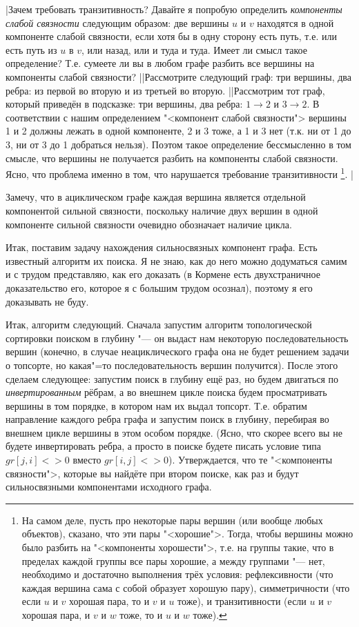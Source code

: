 \task|Зачем требовать транзитивность? Давайте я попробую определить \emph{компоненты слабой связности} следующим 
образом: две вершины $u$ и $v$ находятся в одной компоненте слабой связности, если хотя бы в одну сторону есть путь, 
т.е. или есть путь из $u$ в $v$, или назад, или и туда и туда. Имеет ли смысл такое определение? Т.е. сумеете ли вы
в любом графе разбить все вершины на компоненты слабой связности?
||Рассмотрите следующий граф: три вершины, два ребра: из первой во вторую и из третьей во вторую.
||Рассмотрим тот граф, который приведён в подсказке: три вершины, два ребра: $1\to 2$ и $3\to 2$.
В соответствии с нашим определением "<компонент слабой связности"> вершины 1 и 2 должны лежать в одной компоненте,
2 и 3 тоже, а 1 и 3 нет (т.к. ни от 1 до 3, ни от 3 до 1 добраться нельзя). Поэтом такое определение
бессмысленно в том смысле, что вершины не получается разбить на компоненты слабой связности. Ясно, что проблема
именно в том, что нарушается требование транзитивности%
\footnote{На самом деле, пусть про некоторые пары вершин (или вообще любых объектов), сказано, что эти пары "<хорошие">.
Тогда, чтобы вершины можно было разбить на "<компоненты хорошести">, т.е. на группы такие, что
в пределах каждой группы все пары хорошие, а между группами "--- нет, необходимо и достаточно
выполнения трёх условия: рефлексивности (что каждая вершина сама с собой образует хорошую пару),
симметричности (что если $u$ и $v$ хорошая пара, то и $v$ и $u$ тоже), и транзитивности
(если $u$ и $v$ хорошая пара, и $v$ и $w$ тоже, то и $u$ и $w$ тоже).}.
|\label{transitive}

Замечу, что в ациклическом графе каждая вершина является отдельной компонентой сильной связности, поскольку наличие двух
вершин в одной компоненте сильной связности очевидно обозначает наличие цикла.

Итак, поставим задачу нахождения сильносвязных компонент графа. Есть известный алгоритм их поиска. Я не знаю,
как до него можно додуматься самим и с трудом представляю, как его доказать (в Кормене есть двухстраничное 
доказательство его, которое я с большим трудом осознал), поэтому я его доказывать не буду.

Итак, алгоритм следующий. Сначала запустим алгоритм топологической сортировки поиском в глубину "--- он выдаст 
нам некоторую последовательность вершин (конечно, в случае неациклического графа она не будет решением задачи о топсорте, 
но какая"=то последовательность вершин получится). После этого сделаем следующее: запустим поиск в глубину ещё раз, но будем
двигаться по \textit{инвертированным} рёбрам, а во внешнем цикле поиска будем просматривать вершины в том порядке, 
в котором нам их выдал топсорт. Т.е. обратим направление каждого ребра графа и запустим поиск в глубину, перебирая 
во внешнем цикле вершины в этом особом порядке. (Ясно, что скорее всего вы не будете инвертировать ребра,
а просто в поиске будете писать условие типа $gr[j,i]<>0$ вместо $gr[i,j]<>0$). Утверждается, что те "<компоненты
связности">, которые вы найдёте при втором поиске, как раз и будут сильносвязными компонентами исходного графа.

